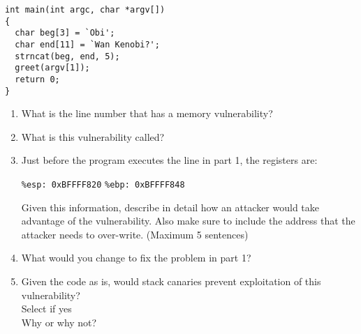 \documentclass[12pt]{exam}
\newcommand{\solbox}[2]{%
\fbox{%
\parbox[c][#1][t]{\dimexpr\linewidth-2\fboxsep-2\fboxrule}{
  \hrule width \hsize height 0pt
  #2
 }%
}%
\par\vspace{\ht\strutbox}
}
\newcommand{\textfield}[3]{%
\iftoggle{pdfform}{%
\TextField[name = #1, backgroundcolor=white, height=#2,
width = \linewidth, multiline=true]{\mbox}%
}{%
\ifprintanswers\else{%
    \solbox{#2}{#3}}
\fi%
}%
}
\newcommand{\includesolution}[1]{%
\IfFileExists{solutions/#1.tex}{%
\begin{solution}%
%
\end{solution}%
}{}
}
\newcommand{\checkbox}[3]{%
\ifprintanswers\else%
\CheckBox[name = #1, checked = #3, backgroundcolor=white, bordercolor=black, #2]{}%
\fi%
}
\begin{document}
\begin{Form}
\begin{questions}
\begin{lstlisting}
int main(int argc, char *argv[])
{
  char beg[3] = `Obi';
  char end[11] = `Wan Kenobi?';
  strncat(beg, end, 5);
  greet(argv[1]);
  return 0;
}
\end{lstlisting}

\begin{enumerate}
  \item What is the line number that has a memory vulnerability? \\
\textfield{Q4P1}{0.5cm}{
    5
}
  \item What is this vulnerability called?\\
\textfield{Q4P2}{0.5cm}{
    buffer overflow attack
}
  \item Just before the program executes the line in part 1, the registers are:
    \begin{center}
      \texttt{\%esp: 0xBFFFF820}
      \hspace{2cm}
      \texttt{\%ebp: 0xBFFFF848}
    \end{center}
    Given this information, describe in detail how an attacker would take advantage of the vulnerability.
    Also make sure to include the address that the attacker needs to over-write. (Maximum 5 sentences)\\
\textfield{Q4P3}{2.7cm}{
    The most simple exploit is code injection. The attacker should input more than 12 characters (I can't determine the exact number because of memory alignment issue) and overwrite the function return address area. The address that the attacker need to overwrite is 0xbffff820. By the way, the attacker can printf any stack data as he want.
}
  \item What would you change to fix the problem in part 1?\\
\textfield{Q4P4}{4cm}{
    Please use C++ std::getline rather than unsafe scanf. An example written by me is here: \url{https://github.com/recolic/rlib/blob/3a442c6dd8661d45cfe7528112b93c42ffa5d591/stdio.hpp\#L52} \\
    
        If I must figure out the implementation of std::getline, please read here: \url{https://github.com/recolic/rlib/blob/3a442c6dd8661d45cfe7528112b93c42ffa5d591/sys/sio.hpp\#L516}
}
  \item Given the code as is, would stack canaries prevent exploitation of this vulnerability?\\
      Select if yes \checkbox{Q4P5Y}{}{
      false}\\
    Why or why not?\\
\textfield{Q4P5}{2cm}{
    Stack canaries can make the exploit harder, but it won't prevent the exploitation. The attacker can still printf data on stack. However, canaries are still very very useful to protect this program. I considered for some time and answer "no".
}
\end{enumerate}
\includesolution{sol4}



\end{questions}
\end{Form}
\end{document}

